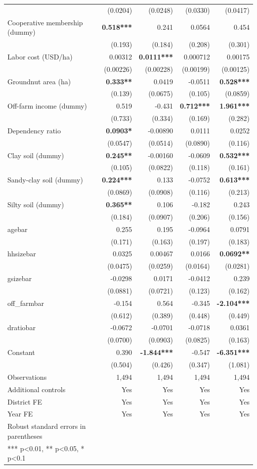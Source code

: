 \documentclass[
]{article}
\begin{document}
\begin{longtable}[t]{lrrrr}
 & (0.0204) & (0.0248) & (0.0330) & (0.0417)\\
Cooperative membership (dummy) & \textbf{0.518***} & 0.241 & 0.0564 & 0.454\\
 & (0.193) & (0.184) & (0.208) & (0.301)\\
Labor cost (USD/ha) & 0.00312 & \textbf{0.0111***} & 0.000712 & 0.00175\\
 & (0.00226) & (0.00228) & (0.00199) & (0.00125)\\
Groundnut area (ha) & \textbf{0.333**} & 0.0419 & -0.0511 & \textbf{0.528***}\\
 & (0.139) & (0.0675) & (0.105) & (0.0859)\\
Off-farm income (dummy) & 0.519 & -0.431 & \textbf{0.712***} & \textbf{1.961***}\\
 & (0.733) & (0.334) & (0.169) & (0.282)\\
Dependency ratio & \textbf{0.0903*} & -0.00890 & 0.0111 & 0.0252\\
 & (0.0547) & (0.0514) & (0.0890) & (0.116)\\
Clay soil (dummy) & \textbf{0.245**} & -0.00160 & -0.0609 & \textbf{0.532***}\\
 & (0.105) & (0.0822) & (0.118) & (0.161)\\
Sandy-clay soil (dummy) & \textbf{0.224***} & 0.133 & -0.0752 & \textbf{0.613***}\\
 & (0.0869) & (0.0908) & (0.116) & (0.213)\\
Silty soil (dummy) & \textbf{0.365**} & 0.106 & -0.182 & 0.243\\
 & (0.184) & (0.0907) & (0.206) & (0.156)\\
agebar & 0.255 & 0.195 & -0.0964 & 0.0791\\
 & (0.171) & (0.163) & (0.197) & (0.183)\\
hhsizebar & 0.0325 & 0.00467 & 0.0166 & \textbf{0.0692**}\\
 & (0.0475) & (0.0259) & (0.0164) & (0.0281)\\
gsizebar & -0.0298 & 0.0171 & -0.0412 & 0.239\\
 & (0.0881) & (0.0721) & (0.123) & (0.162)\\
off\_farmbar & -0.154 & 0.564 & -0.345 & \textbf{-2.104***}\\
 & (0.612) & (0.389) & (0.448) & (0.449)\\
dratiobar & -0.0672 & -0.0701 & -0.0718 & 0.0361\\
 & (0.0700) & (0.0903) & (0.0825) & (0.163)\\
Constant & 0.390 & \textbf{-1.844***} & -0.547 & \textbf{-6.351***}\\
\midrule
 & (0.504) & (0.426) & (0.347) & (1.081)\\
Observations & 1,494 & 1,494 & 1,494 & 1,494\\
Additional controls & Yes & Yes & Yes & Yes\\
District FE & Yes & Yes & Yes & Yes\\
Year FE & Yes & Yes & Yes & Yes\\
\midrule
Robust standard errors in parentheses &  &  &  & \\
*** p<0.01, ** p<0.05, * p<0.1 &  &  &  & \\*
\end{longtable}
\end{document}
